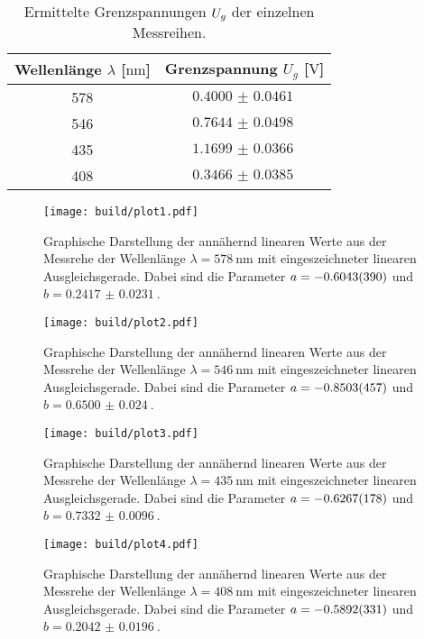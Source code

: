 \begin{table}
    \caption{Ermittelte Grenzspannungen $\protect U_{g}$ der einzelnen Messreihen.}
    \centering
    \label{tab:ugrenz}
    \begin{tabular}{c c}
        \toprule
        Wellenlänge $\lambda$ [$\si{\nano\meter}$] & Grenzspannung $U_{g}$ [$\si{\volt}$] \\
        \midrule
        578 & $\SI{0.4000(461)}{}$\\
        546 & $\SI{0.7644(498)}{}$\\
        435 & $\SI{1.1699(366)}{}$\\
        408 & $\SI{0.3466(385)}{}$\\
        \bottomrule    
    \end{tabular}
\end{table}

\begin{figure}
    \centering
    \texttt{[image: build/plot1.pdf]}
    \caption{Graphische Darstellung der annähernd linearen Werte aus der Messrehe der Wellenlänge $\lambda = \SI{578}{\nano\meter}$ mit eingeszeichneter linearen Ausgleichsgerade. Dabei sind die Parameter $\protect a = \SI{-0.6043(390)}{}$ und $b = \SI{0.2417(231)}{}$.} 
    \label{fig:gelb}
\end{figure}

\begin{figure}
    \centering
    \texttt{[image: build/plot2.pdf]}
    \caption{Graphische Darstellung der annähernd linearen Werte aus der Messrehe der Wellenlänge $\lambda = \SI{546}{\nano\meter}$ mit eingeszeichneter linearen Ausgleichsgerade. Dabei sind die Parameter $\protect a = \SI{-0.8503(457)}{}$ und $b = \SI{0.6500(240)}{}$.} 
    \label{fig:grün}
\end{figure}

\begin{figure}
    \centering
    \texttt{[image: build/plot3.pdf]}
    \caption{Graphische Darstellung der annähernd linearen Werte aus der Messrehe der Wellenlänge $\lambda = \SI{435}{\nano\meter}$ mit eingeszeichneter linearen Ausgleichsgerade. Dabei sind die Parameter $\protect a = \SI{-0.6267(178)}{}$ und $b = \SI{0.7332(96)}{}$.} 
    \label{fig:violet}
\end{figure}

\begin{figure}
    \centering
    \texttt{[image: build/plot4.pdf]}
    \caption{Graphische Darstellung der annähernd linearen Werte aus der Messrehe der Wellenlänge $\lambda = \SI{408}{\nano\meter}$ mit eingeszeichneter linearen Ausgleichsgerade. Dabei sind die Parameter $\protect a = \SI{-0.5892(331)}{}$ und $b = \SI{0.2042(196)}{}$.} 
    \label{fig:GIGAviolet}
\end{figure}


